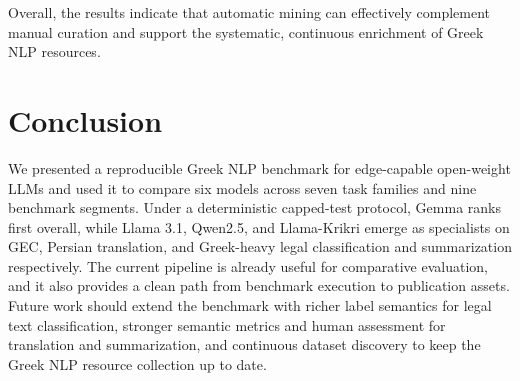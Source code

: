 \documentclass[sigconf,review,anonymous]{acmart}
\newcommand{\assetsdir}{article_assets}
\begin{document}
Overall, the results indicate that automatic mining can effectively complement manual curation and support the systematic, continuous enrichment of Greek NLP resources.




\section{Conclusion}
We presented a reproducible Greek NLP benchmark for edge-capable open-weight LLMs and used it to compare six models across seven task families and nine benchmark segments. Under a deterministic capped-test protocol, Gemma ranks first overall, while Llama 3.1, Qwen2.5, and Llama-Krikri emerge as specialists on GEC, Persian translation, and Greek-heavy legal classification and summarization respectively. The current pipeline is already useful for comparative evaluation, and it also provides a clean path from benchmark execution to publication assets.
Future work should extend the benchmark with richer label semantics for legal text classification, stronger semantic metrics and human assessment for translation and summarization, and continuous dataset discovery to keep the Greek NLP resource collection up to date.




\appendix

\end{document}
